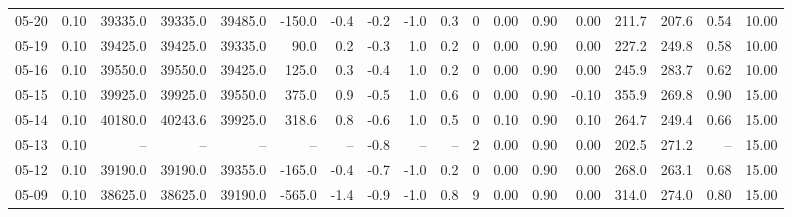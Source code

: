 \begin{threeparttable}
{\begin{tabular}{lrrrrrrrrrrrrrrrrr}
  05-20 &     0.10 & 39335.0 & 39335.0 & 39485.0 &     -150.0 &           -0.4 &                      -0.2 &                     -1.0 &                 0.3 &              0 &       0.00 &      0.90 &           0.00 &            211.7 &               207.6 &            0.54 &                  10.00 \\
  05-19 &     0.10 & 39425.0 & 39425.0 & 39335.0 &       90.0 &            0.2 &                      -0.3 &                      1.0 &                 0.2 &              0 &       0.00 &      0.90 &           0.00 &            227.2 &               249.8 &            0.58 &                  10.00 \\
  05-16 &     0.10 & 39550.0 & 39550.0 & 39425.0 &      125.0 &            0.3 &                      -0.4 &                      1.0 &                 0.2 &              0 &       0.00 &      0.90 &           0.00 &            245.9 &               283.7 &            0.62 &                  10.00 \\
  05-15 &     0.10 & 39925.0 & 39925.0 & 39550.0 &      375.0 &            0.9 &                      -0.5 &                      1.0 &                 0.6 &              0 &       0.00 &      0.90 &          -0.10 &            355.9 &               269.8 &            0.90 &                  15.00 \\
  05-14 &     0.10 & 40180.0 & 40243.6 & 39925.0 &      318.6 &            0.8 &                      -0.6 &                      1.0 &                 0.5 &              0 &       0.10 &      0.90 &           0.10 &            264.7 &               249.4 &            0.66 &                  15.00 \\
  05-13 &     0.10 &      -- &      -- &      -- &         -- &             -- &                      -0.8 &                       -- &                  -- &              2 &       0.00 &      0.90 &           0.00 &            202.5 &               271.2 &              -- &                  15.00 \\
  05-12 &     0.10 & 39190.0 & 39190.0 & 39355.0 &     -165.0 &           -0.4 &                      -0.7 &                     -1.0 &                 0.2 &              0 &       0.00 &      0.90 &           0.00 &            268.0 &               263.1 &            0.68 &                  15.00 \\
  05-09 &     0.10 & 38625.0 & 38625.0 & 39190.0 &     -565.0 &           -1.4 &                      -0.9 &                     -1.0 &                 0.8 &              9 &       0.00 &      0.90 &           0.00 &            314.0 &               274.0 &            0.80 &                  15.00 \\

\end{tabular}}
\end{threeparttable}
